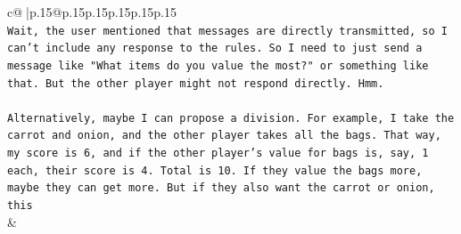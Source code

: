 \documentclass{article}
\begin{document}
{\begin{supertabular}{c@{$\;$}|p{.15\linewidth}@{}p{.15\linewidth}p{.15\linewidth}p{.15\linewidth}p{.15\linewidth}p{.15\linewidth}}
{{{\\ 
\texttt{Wait, the user mentioned that messages are directly transmitted, so I can't include any response to the rules. So I need to just send a message like "What items do you value the most?" or something like that. But the other player might not respond directly. Hmm.} \\
\\ 
\texttt{Alternatively, maybe I can propose a division. For example, I take the carrot and onion, and the other player takes all the bags. That way, my score is 6, and if the other player's value for bags is, say, 1 each, their score is 4. Total is 10. If they value the bags more, maybe they can get more. But if they also want the carrot or onion, this} \\
            }
        }
    }
    & \\ \\


\end{supertabular}}
\end{document}
